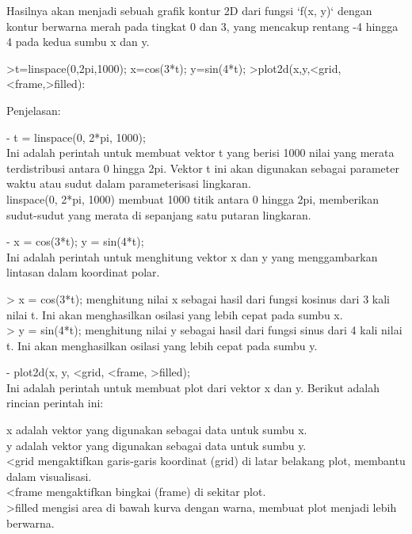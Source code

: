 \documentclass[a4paper,10pt]{article}
\begin{document}
\begin{eulernotebook}
\begin{eulercomment}
\begin{eulercomment}
\begin{eulercomment}
\begin{eulercomment}
\begin{eulercomment}
\begin{eulercomment}
\begin{eulercomment}
\begin{eulercomment}
\begin{eulercomment}
\begin{eulercomment}
\begin{eulercomment}
\begin{eulercomment}
\begin{eulercomment}
Hasilnya akan menjadi sebuah grafik kontur 2D dari fungsi `f(x, y)`
dengan kontur berwarna merah pada tingkat 0 dan 3, yang mencakup
rentang -4 hingga 4 pada kedua sumbu x dan y.

\end{eulercomment}
\begin{eulerprompt}
>t=linspace(0,2pi,1000); x=cos(3*t); y=sin(4*t);
>plot2d(x,y,<grid,<frame,>filled):
\end{eulerprompt}
\begin{eulercomment}
Penjelasan:

- t = linspace(0, 2*pi, 1000);\\
Ini adalah perintah untuk membuat vektor t yang berisi 1000 nilai yang
merata terdistribusi antara 0 hingga 2pi. Vektor t ini akan digunakan
sebagai parameter waktu atau sudut dalam parameterisasi lingkaran.\\
linspace(0, 2*pi, 1000) membuat 1000 titik antara 0 hingga 2pi,
memberikan sudut-sudut yang merata di sepanjang satu putaran
lingkaran.

- x = cos(3*t); y = sin(4*t);\\
Ini adalah perintah untuk menghitung vektor x dan y yang menggambarkan
lintasan dalam koordinat polar.

\textgreater{} x = cos(3*t); menghitung nilai x sebagai hasil dari fungsi kosinus
dari 3 kali nilai t. Ini akan menghasilkan osilasi yang lebih cepat
pada sumbu x.\\
\textgreater{} y = sin(4*t); menghitung nilai y sebagai hasil dari fungsi sinus
dari 4 kali nilai t. Ini akan menghasilkan osilasi yang lebih cepat
pada sumbu y.

- plot2d(x, y, \textless{}grid, \textless{}frame, \textgreater{}filled);\\
Ini adalah perintah untuk membuat plot dari vektor x dan y. Berikut
adalah rincian perintah ini:

x adalah vektor yang digunakan sebagai data untuk sumbu x.\\
y adalah vektor yang digunakan sebagai data untuk sumbu y.\\
\textless{}grid mengaktifkan garis-garis koordinat (grid) di latar belakang
plot, membantu dalam visualisasi.\\
\textless{}frame mengaktifkan bingkai (frame) di sekitar plot.\\
\textgreater{}filled mengisi area di bawah kurva dengan warna, membuat plot menjadi
lebih berwarna.


\end{eulercomment}
\end{eulercomment}
\end{eulercomment}
\end{eulercomment}
\end{eulercomment}
\end{eulercomment}
\end{eulercomment}
\end{eulercomment}
\end{eulercomment}
\end{eulercomment}
\end{eulercomment}
\end{eulercomment}
\end{eulercomment}
\end{eulernotebook}
\end{document}

